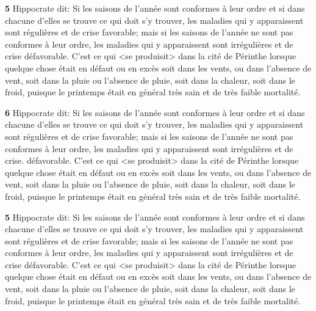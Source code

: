 \documentclass[12pt,a4paper]{memoir}
\begin{document}
\begin{pages}
\begin{Leftside}
\pstart\vspace{2.1\baselineskip}
\textbf{5}
Hippocrate dit: Si les saisons de l'année sont conformes à leur ordre
et si dans chacune d'elles se trouve ce qui doit s'y trouver, les
maladies qui y apparaissent sont régulières et de crise favorable;
mais si les saisons de l'année ne sont pas conformes à leur ordre, les
maladies qui y apparaissent sont irrégulières et de crise
défavorable. C'est ce qui <se produisit> dans la cité de Périnthe
lorsque quelque chose était en défaut ou en excès soit dans les vents,
ou dans l'absence de vent, soit dans la pluie ou l'absence de pluie,
soit dans la chaleur, soit dans le froid, puisque le printemps était
en général très sain et de très faible mortalité.
\pend

\pstart\vspace{2.1\baselineskip}
\textbf{6}
Hippocrate dit: Si les saisons de l'année sont conformes à leur ordre
et si dans chacune d'elles se trouve ce qui doit s'y trouver, les
maladies qui y apparaissent sont régulières et de crise favorable;
mais si les saisons de l'année ne sont pas conformes à leur ordre, les
maladies qui y apparaissent sont irrégulières et de crise.
défavorable. C'est ce qui <se produisit> dans la cité de Périnthe
lorsque quelque chose était en défaut ou en excès soit dans les vents,
ou dans l'absence de vent, soit dans la pluie ou l'absence de pluie,
soit dans la chaleur, soit dans le froid, puisque le printemps était
en général très sain et de très faible mortalité.
\pend

\pstart\vspace{2.1\baselineskip}
\textbf{5}
Hippocrate dit: Si les saisons de l'année sont conformes à leur ordre
et si dans chacune d'elles se trouve ce qui doit s'y trouver, les
maladies qui y apparaissent sont régulières et de crise favorable;
mais si les saisons de l'année ne sont pas conformes à leur ordre, les
maladies qui y apparaissent sont irrégulières et de crise
défavorable. C'est ce qui <se produisit> dans la cité de Périnthe
lorsque quelque chose était en défaut ou en excès soit dans les vents,
ou dans l'absence de vent, soit dans la pluie ou l'absence de pluie,
soit dans la chaleur, soit dans le froid, puisque le printemps était
en général très sain et de très faible mortalité.
\pend



\endnumbering

\end{Leftside}


\end{pages}
\end{document}
